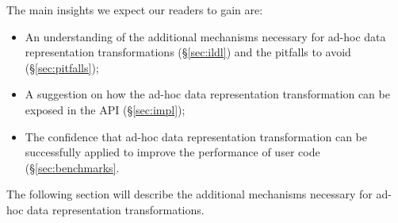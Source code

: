 %

%

The main insights we expect our readers to gain are:
\begin{itemize}
  \item An understanding of the additional mechanisms necessary for ad-hoc data representation transformations (\S\ref{sec:ildl}) and the pitfalls to avoid (\S\ref{sec:pitfalls});
  \item A suggestion on how the ad-hoc data representation transformation can be exposed in the API (\S\ref{sec:impl});
  \item The confidence that ad-hoc data representation transformation can be successfully applied to improve the performance of user code (\S\ref{sec:benchmarks}.
\end{itemize}


The following section will describe the additional mechanisms necessary for ad-hoc data representation transformations.